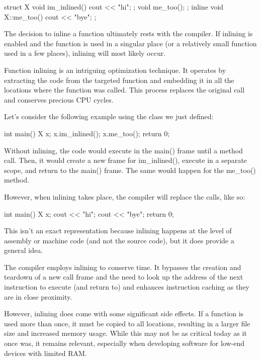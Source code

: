 \begin{cpp}
struct X {
    void im_inlined(){ cout << "hi\n"; };
    void me_too();
};
inline void X::me_too() { cout << "bye\n"; };
\end{cpp}

The decision to inline a function ultimately rests with the compiler. If inlining is enabled and the function is used in a singular place (or a relatively small function used in a few places), inlining will most likely occur.

Function inlining is an intriguing optimization technique. It operates by extracting the code from the targeted function and embedding it in all the locations where the function was called. This process replaces the original call and conserves precious CPU cycles.

Let’s consider the following example using the class we just defined:

\begin{cpp}
int main() {
    X x;
    x.im_inlined();
    x.me_too();
    return 0;
}
\end{cpp}

Without inlining, the code would execute in the main() frame until a method call. Then, it would create a new frame for im\_inlined(), execute in a separate scope, and return to the main() frame. The same would happen for the me\_too() method.

However, when inlining takes place, the compiler will replace the calls, like so:

\begin{cpp}
int main() {
    X x;
    cout << "hi\n";
    cout << "bye\n";
    return 0;
}
\end{cpp}

This isn’t an exact representation because inlining happens at the level of assembly or machine code (and not the source code), but it does provide a general idea.

The compiler employs inlining to conserve time. It bypasses the creation and teardown of a new call frame and the need to look up the address of the next instruction to execute (and return to) and enhances instruction caching as they are in close proximity.

However, inlining does come with some significant side effects. If a function is used more than once, it must be copied to all locations, resulting in a larger file size and increased memory usage. While this may not be as critical today as it once was, it remains relevant, especially when developing software for low-end devices with limited RAM.

